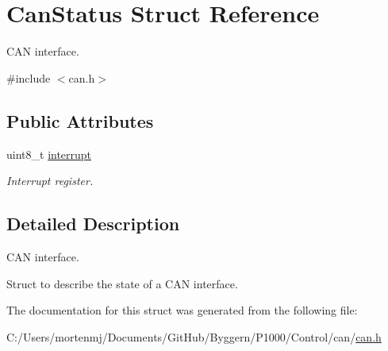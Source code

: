 \hypertarget{struct_can_status}{\section{Can\-Status Struct Reference}
\label{struct_can_status}
}


C\-A\-N interface.  




{\ttfamily \#include $<$can.\-h$>$}

\subsection*{Public Attributes}
\begin{DoxyCompactItemize}
\item 
\hypertarget{struct_can_status_a058f7321dc87da8aa2b12de8e4dde955}{uint8\-\_\-t \hyperlink{struct_can_status_a058f7321dc87da8aa2b12de8e4dde955}{interrupt}}\label{struct_can_status_a058f7321dc87da8aa2b12de8e4dde955}

\begin{DoxyCompactList}\small\item\em Interrupt register. \end{DoxyCompactList}\end{DoxyCompactItemize}


\subsection{Detailed Description}
C\-A\-N interface. 

Struct to describe the state of a C\-A\-N interface. 

The documentation for this struct was generated from the following file\-:\begin{DoxyCompactItemize}
\item 
C\-:/\-Users/mortenmj/\-Documents/\-Git\-Hub/\-Byggern/\-P1000/\-Control/can/\hyperlink{can_8h}{can.\-h}\end{DoxyCompactItemize}
